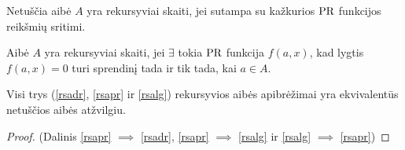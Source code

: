 \begin{defn}
  \label{rsapr}
  Netuščia aibė $A$ yra rekursyviai skaiti, jei sutampa su kažkurios
  $\mathop{\text{PR}}$ funkcijos reikšmių sritimi.
\end{defn}

\begin{defn}
  \label{rsalg}
  Aibė $A$ yra rekursyviai skaiti, jei $\exists$ tokia $\mathop{\text{PR}}$ funkcija
  $f(a,x)$, kad lygtis $f(a, x) = 0$ turi sprendinį tada ir tik tada, kai
  $a \in A$.
\end{defn}

\begin{prop}
  Visi trys (\ref{rsadr}, \ref{rsapr} ir \ref{rsalg}) rekursyvios aibės
  apibrėžimai yra ekvivalentūs netuščios aibės atžvilgiu.
  \begin{proof}
    (Dalinis \ref{rsapr} $\implies$ \ref{rsadr}, 
    \ref{rsapr} $\implies$ \ref{rsalg} ir 
    \ref{rsalg} $\implies$ \ref{rsapr})


\end{proof}
\end{prop}
